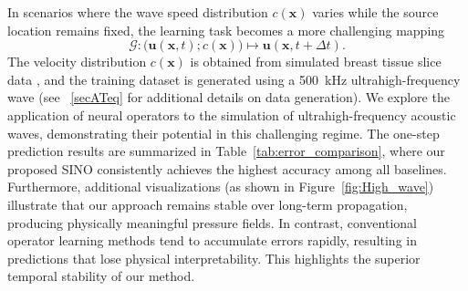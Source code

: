 \documentclass[preprint,numbers,sort&compress]{elsarticle}
\begin{document}
			
			In scenarios where the wave speed distribution \(c(\mathbf{x})\) varies while the source location remains fixed, 
			the learning task becomes a more challenging mapping 
			\[\mathcal{G}: \big(\boldsymbol{u}(\mathbf{x},t); c(\mathbf{x}) \big) \mapsto \boldsymbol{u}(\mathbf{x},t+\Delta t).\] 
			The velocity distribution \(c(\mathbf{x})\) is obtained from simulated breast tissue slice data 
			\cite{zeng2025openbreastus}, and the training dataset is generated using a 500~kHz ultrahigh-frequency wave 
			(see ~\ref{secATeq} for additional details on data generation). 
			{We explore the application of neural operators to the simulation of ultrahigh-frequency acoustic waves, demonstrating their potential in this challenging regime.}
			The one-step prediction results are summarized in Table~\ref{tab:error_comparison}, 
			where our proposed SINO consistently achieves the highest accuracy among all baselines. 
			Furthermore, additional visualizations (as shown in Figure~\ref{fig:High_wave}) illustrate that our approach 
			remains stable over long-term propagation, producing physically meaningful pressure fields. 
			In contrast, conventional operator learning methods tend to accumulate errors rapidly, 
			resulting in predictions that lose physical interpretability. 
			This highlights the superior temporal stability of our method.
			
\end{document}
